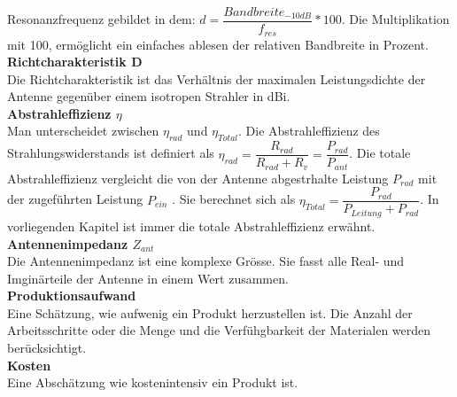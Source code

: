 Resonanzfrequenz gebildet in dem: $d=\dfrac{Bandbreite_{-10dB}}{f_{res}}*100$. Die Multiplikation mit 100, ermöglicht ein einfaches ablesen der relativen Bandbreite in Prozent. \\
\textbf{Richtcharakteristik D}\\
Die Richtcharakteristik ist das Verhältnis der maximalen Leistungsdichte der Antenne gegenüber einem isotropen Strahler in dBi.\\
\textbf{Abstrahleffizienz $\eta$}\\
Man unterscheidet zwischen $\eta_{rad}$ und $\eta_{Total}$. Die Abstrahleffizienz des Strahlungswiderstands ist definiert als $\eta_{rad}=\dfrac{R_{rad}}{R_{rad}+R_v}=\dfrac{P_{rad}}{P_{ant}}$. Die totale Abstrahleffizienz vergleicht die von der Antenne abgestrhalte Leistung $P_{rad}$ mit der zugeführten Leistung $P_{ein}$ . Sie berechnet sich als $\eta_{Total}=\dfrac{P_{rad}}{P_{Leitung}+P_{rad}}$. In vorliegenden Kapitel ist immer die totale Abstrahleffizienz erwähnt.\\
\textbf{Antennenimpedanz $Z_{ant}$}\\
Die Antennenimpedanz ist eine komplexe Grösse. Sie fasst alle Real- und Imginärteile der Antenne in einem Wert zusammen.\\
\textbf{Produktionsaufwand}\\
Eine Schätzung, wie aufwenig ein Produkt herzustellen ist. Die Anzahl der Arbeitsschritte oder die Menge und die Verfühgbarkeit der Materialen werden berücksichtigt.\\
\textbf{Kosten}\\
Eine Abschätzung wie kostenintensiv ein Produkt ist.
\newpage 
\thispagestyle{empty}

